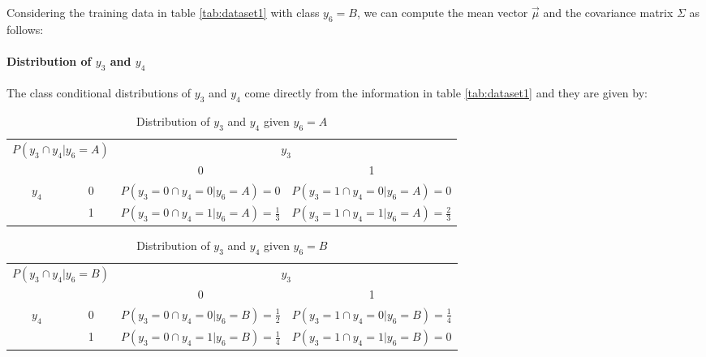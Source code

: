 \documentclass{article}
\begin{document}
Considering the training data in table \ref{tab:dataset1} with class $y_6=B$, we can compute the mean vector $\vec{\mu}$ and the covariance matrix $\Sigma$ as follows:





\paragraph{Distribution of $y_3$ and $y_4$}

The class conditional distributions of $y_3$ and $y_4$ come directly from the information in table \ref{tab:dataset1} and they are given by:

\begin{table}[h!]
\centering
\begin{tabular}{|cc|cc|}
\hline
\multicolumn{2}{|c|}{\multirow{2}{*}{$P(y_3 \cap y_4|y_6=A)$}} & \multicolumn{2}{c|}{$y_3$}                     \\ \cline{3-4} 
\multicolumn{2}{|c|}{}                                   & \multicolumn{1}{c|}{0}           & 1           \\ \hline
\multicolumn{1}{|c|}{\multirow{2}{*}{$y_4$}}     & 0     & \multicolumn{1}{c|}{$P(y_3=0 \cap y_4=0|y_6=A) =0$} & $P(y_3=1 \cap y_4=0|y_6=A) =0$ \\ \cline{2-4} 
\multicolumn{1}{|c|}{}                           & 1     & \multicolumn{1}{c|}{$P(y_3=0 \cap y_4=1|y_6=A) =\frac{1}{3}$} & $P(y_3=1 \cap y_4=1|y_6=A) =\frac{2}{3}$ \\ \hline
\end{tabular}
\caption{Distribution of $y_3$ and $y_4$ given $y_6=A$}
\end{table}

\begin{table}[h!]
\centering
\begin{tabular}{|cc|cc|}
\hline
\multicolumn{2}{|c|}{\multirow{2}{*}{$P(y_3 \cap y_4|y_6=B)$}} & \multicolumn{2}{c|}{$y_3$}                     \\ \cline{3-4}
\multicolumn{2}{|c|}{}                                   & \multicolumn{1}{c|}{0}           & 1           \\ \hline
\multicolumn{1}{|c|}{\multirow{2}{*}{$y_4$}}     & 0     & \multicolumn{1}{c|}{$P(y_3=0 \cap y_4=0|y_6=B) = \frac{1}{2}$} & $P(y_3=1 \cap y_4=0|y_6=B) =\frac{1}{4}$ \\ \cline{2-4} 
\multicolumn{1}{|c|}{}                           & 1     & \multicolumn{1}{c|}{$P(y_3=0 \cap y_4=1|y_6=B) =\frac{1}{4}$} & $P(y_3=1 \cap y_4=1|y_6=B) =0$ \\ \hline
\end{tabular}
\caption{Distribution of $y_3$ and $y_4$ given $y_6=B$}
\end{table}
\end{document}
